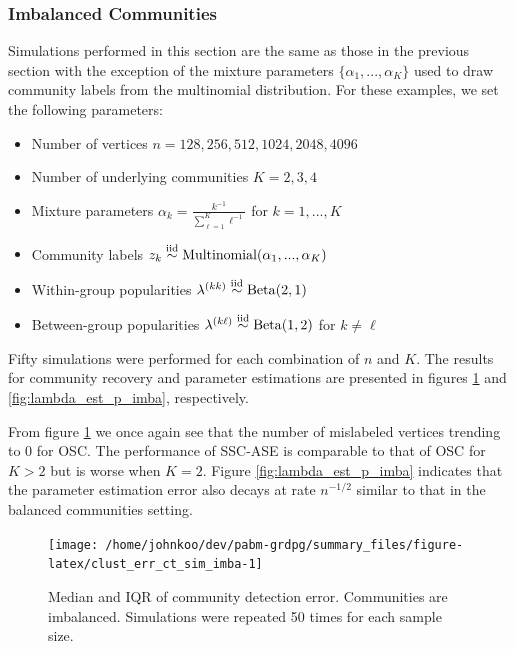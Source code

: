 \documentclass[
  12pt,
]{article}
\providecommand{\tightlist}{%
  \setlength{\itemsep}{0pt}\setlength{\parskip}{0pt}}
\theoremstyle{definition}
\theoremstyle{definition}
\theoremstyle{definition}
\theoremstyle{definition}
\theoremstyle{remark}
\begin{document}
\hypertarget{sec:imbalanced-communities}{%
\subsubsection{Imbalanced Communities}\label{sec:imbalanced-communities}}

Simulations performed in this section are the same as those in the
previous section with the exception of the mixture parameters
\(\{\alpha_1, ..., \alpha_K\}\) used to draw community labels from the
multinomial distribution. For these examples, we set the following
parameters:

\begin{itemize}
\tightlist
\item
Number of vertices \(n = 128, 256, 512, 1024, 2048, 4096\)
\item
Number of underlying communities \(K = 2, 3, 4\)
\item
Mixture parameters \(\alpha_k = \frac{k^{-1}}{\sum_{\ell=1}^K \ell^{-1}}\)
for \(k = 1, ..., K\)
\item
Community labels
\(z_k \stackrel{\text{iid}}{\sim} \mathrm{Multinomial}(\alpha_1, ..., \alpha_K)\)
\item
Within-group popularities
\(\lambda^{(kk)} \stackrel{\text{iid}}{\sim} \mathrm{Beta}(2, 1)\)
\item
Between-group popularities
\(\lambda^{(k \ell)} \stackrel{\text{iid}}{\sim} \mathrm{Beta}(1, 2)\) for
\(k \neq \ell\)
\end{itemize}

Fifty simulations were performed for each combination of \(n\) and \(K\).
The results for community recovery and parameter estimations are presented in figures \ref{fig:clust_err_ct_sim_imba} and \ref{fig:lambda_est_p_imba}, respectively.

From figure \ref{fig:clust_err_ct_sim_imba} we once again see that the
number of mislabeled vertices trending to \(0\) for OSC.
The performance of SSC-ASE is comparable to that of OSC for \(K > 2\) but is worse when \(K = 2\).
Figure \ref{fig:lambda_est_p_imba} indicates that the parameter estimation error also decays at rate \(n^{-1/2}\) similar to that in the balanced communities setting.

\begin{figure}[H]
{\centering \texttt{[image: /home/johnkoo/dev/pabm-grdpg/summary\_files/figure-latex/clust\_err\_ct\_sim\_imba-1]}
}
\caption{Median and IQR of community detection error. Communities are imbalanced. 
Simulations were repeated 50 times for each sample size.}\label{fig:clust_err_ct_sim_imba}
\end{figure}
\end{document}
